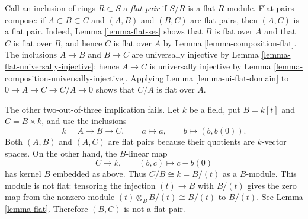 \begin{remark}
\label{remark-flat-pairs-not-two-out-of-three}
\begin{reference}
\cite[Appendix, nos. 22--23]{GAGA}
\end{reference}
Call an inclusion of rings $R \subset S$ a \emph{flat pair} if $S/R$ is a
flat $R$-module. Flat pairs compose: if $A \subset B \subset C$ and
$(A, B)$ and $(B, C)$ are flat pairs, then $(A, C)$ is a flat pair.
Indeed, Lemma \ref{lemma-flat-ses} shows that $B$ is flat over $A$ and
that $C$ is flat over $B$, and hence $C$ is flat over $A$ by
Lemma \ref{lemma-composition-flat}. The inclusions $A \to B$ and
$B \to C$ are universally injective by
Lemma \ref{lemma-flat-universally-injective}; hence $A \to C$ is universally
injective by Lemma \ref{lemma-composition-universally-injective}.
Applying Lemma \ref{lemma-ui-flat-domain} to
$0 \to A \to C \to C/A \to 0$ shows that $C/A$ is flat over $A$.

The other two-out-of-three implication fails. Let $k$ be a field, put
$B = k[t]$ and $C = B \times k$, and use the inclusions
$$
k = A \longrightarrow B \longrightarrow C,
\qquad
a \longmapsto a,
\qquad
b \longmapsto (b, b(0)).
$$
Both $(A, B)$ and $(A, C)$ are flat pairs because their quotients are
$k$-vector spaces. On the other hand, the $B$-linear map
$$
C \longrightarrow k,
\qquad
(b, c) \longmapsto c - b(0)
$$
has kernel $B$ embedded as above. Thus $C/B \cong k = B/(t)$ as a
$B$-module. This module is not flat: tensoring the injection $(t) \to B$
with $B/(t)$ gives the zero map from the nonzero module
$(t) \otimes_B B/(t) \cong B/(t)$ to $B/(t)$. See
Lemma \ref{lemma-flat}. Therefore $(B, C)$ is not a flat pair.
\end{remark}

